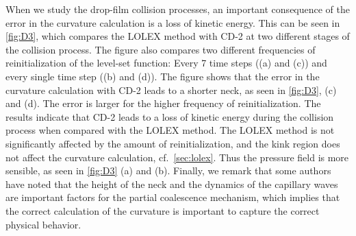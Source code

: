 \documentclass[11pt,b5paper,DIV=calc,BCOR1.3cm,headings=small,%
               footinclude=false,headsepline]{scrbook}
\begin{document}
When we study the drop-film collision processes, an important consequence of
the error in the curvature calculation is a loss of kinetic energy.  This can
be seen in \cref{fig:D3}, which compares the LOLEX method with CD-2 at two
different stages of the collision process.  The figure also compares two
different frequencies of reinitialization of the level-set function:  Every
7 time steps ((a) and (c)) and every single time step ((b) and (d)).  The
figure shows that the error in the curvature calculation with CD-2 leads to
a shorter neck, as seen in \cref{fig:D3}, (c) and (d).  The error is larger for
the higher frequency of reinitialization.  The results indicate that CD-2 leads
to a loss of kinetic energy during the collision process when compared with the
LOLEX method.  The LOLEX method is not significantly affected by the amount of
reinitialization, and the kink region does not affect the curvature
calculation, cf.\ \cref{sec:lolex}.  Thus the pressure field is more sensible,
as seen in \cref{fig:D3} (a) and (b).  Finally, we remark that some authors
have noted \cite{Blanchette06} that the height of the neck and the dynamics of
the capillary waves are important factors for the partial coalescence
mechanism, which implies that the correct calculation of the curvature is
important to capture the correct physical behavior.
\end{document}
